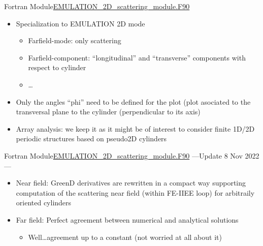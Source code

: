 \begin{frame}{Fortran Module}{\url{EMULATION_2D_scattering_module.F90} }
   \framebreak %
   
   \begin{itemize}
   \item Specialization to EMULATION 2D mode
     \begin{itemize}
     \item Farfield-mode: only scattering %
     \item Farfield-component: ``longitudinal'' and ``transverse''
       components with respect to cylinder
     \item \ldots
     \end{itemize}
     
   \item Only the angles ``phi'' need to be defined for the plot (plot
     asociated to the transversal plane to the cylinder (perpendicular
     to its axis)

   \item Array analysis: we keep it as it might be of interest to
     consider finite 1D/2D periodic structures based on pseudo2D
     cylinders

   \end{itemize}


  \end{frame}

  


  \begin{frame}{Fortran Module}{\url{EMULATION_2D_scattering_module.F90} ---{Update 8 Nov 2022}---}

    \begin{itemize}
    \item Near field: {GreenD} derivatives are rewritten in a compact way
      supporting computation of the scattering near field (within
      FE-IIEE loop) for arbitraily oriented cylinders

    \item Far field: Perfect agreement between numerical and analytical
      solutions
      \begin{itemize}
      \item Well\ldots agreement up to a constant (not worried at all about it)
      \end{itemize}
    \end{itemize}

  \end{frame}


  


  
  
